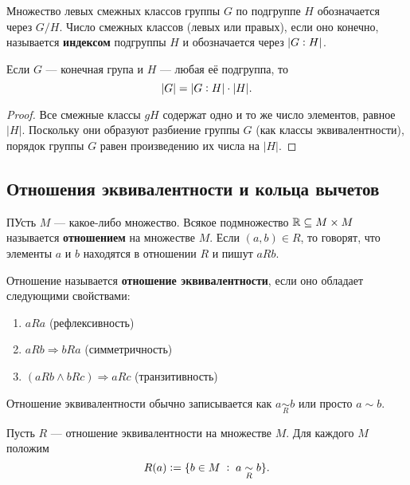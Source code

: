 \begin{definition}
    Множество левых смежных классов группы $G$ по подгруппе $H$ обозначается через $G / H$. Число смежных классов (левых или правых), если оно конечно, называется \textbf{индексом} подгруппы $H$ и обозначается через $|G \vcentcolon H|$.
\end{definition}

\begin{theorem}[Лагранж]
    Если $G$ --- конечная група и $H$ --- любая её подгруппа, то
    $$
    |G| = |G \vcentcolon H|\cdot |H|.
    $$
\end{theorem}

\begin{proof}
    Все смежные классы $gH$ содержат одно и то же число элементов, равное $|H|$. Поскольку они образуют разбиение группы $G$ (как классы эквивалентности), порядок группы $G$ равен произведению их числа на $|H|$.
\end{proof}

\subsection*{Отношения эквивалентности и кольца вычетов\footnotemark}


\begin{definition}
    ПУсть $M$ --- какое-либо множество. Всякое подмножество $\mathbb{R} \subseteq M \times M$ называется \textbf{отношением} на множестве $M$. Если $(a, b) \in R$, то говорят, что элементы $a$ и $b$ находятся в отношении $R$ и пишут $aRb$.
\end{definition}

\begin{definition}
    Отношение называется \textbf{отношение эквивалентности}, если оно обладает следующими свойствами:
    \begin{enumerate}[nolistsep]
        \item $aRa$ (рефлексивность)
        \item $aRb \Rightarrow bRa$ (симметричность)
        \item $(aRb \wedge bRc) \Rightarrow aRc$ (транзитивность)
    \end{enumerate}
    Отношение эквивалентности обычно записывается как $a \underset{R}{\sim} b$ или просто $a \sim b$.
\end{definition}

\begin{definition}
    Пусть $R$ --- отношение эквивалентности на множестве $M$. Для каждого $M$ положим
    $$
    R(a) \vcentcolon = \{b \in M\;\vcentcolon\;a \underset{R}{\sim} b\}.
    $$
\end{definition}

